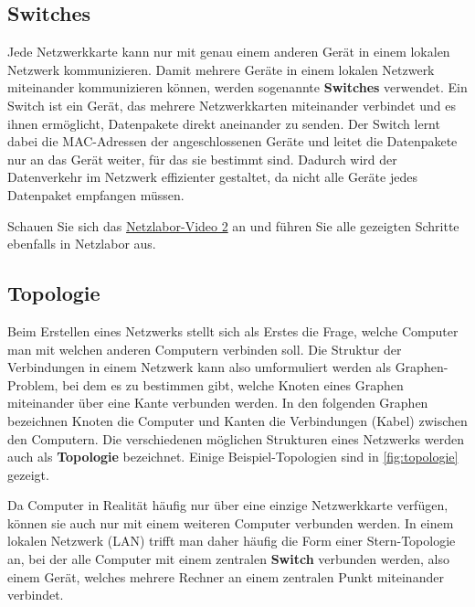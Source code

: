 \subsection{Switches}
Jede Netzwerkkarte kann nur mit genau einem anderen Gerät in einem lokalen Netzwerk kommunizieren. Damit mehrere Geräte in einem lokalen Netzwerk miteinander kommunizieren können, werden sogenannte \textbf{Switches} verwendet. Ein Switch ist ein Gerät, das mehrere Netzwerkkarten miteinander verbindet und es ihnen ermöglicht, Datenpakete direkt aneinander zu senden. Der Switch lernt dabei die \gls{MAC}-Adressen der angeschlossenen Geräte und leitet die Datenpakete nur an das Gerät weiter, für das sie bestimmt sind. Dadurch wird der Datenverkehr im Netzwerk effizienter gestaltet, da nicht alle Geräte jedes Datenpaket empfangen müssen.

\begin{myexercise}
	Schauen Sie sich das \href{\netzlaborvideos}{Netzlabor-Video 2} an und führen Sie alle gezeigten Schritte ebenfalls in Netzlabor aus.
\end{myexercise}

\subsection{Topologie}
Beim Erstellen eines Netzwerks stellt sich als Erstes die Frage, welche Computer man mit welchen anderen Computern verbinden soll. Die Struktur der Verbindungen in einem Netzwerk kann also umformuliert werden als Graphen-Problem, bei dem es zu bestimmen gibt, welche Knoten eines Graphen miteinander über eine Kante verbunden werden. In den folgenden Graphen bezeichnen Knoten die Computer und Kanten die Verbindungen (Kabel) zwischen den Computern. Die verschiedenen möglichen Strukturen eines Netzwerks werden auch als \textbf{Topologie} bezeichnet. Einige Beispiel-Topologien sind in \cref{fig:topologie} gezeigt.


Da Computer in Realität häufig nur über eine einzige Netzwerkkarte verfügen, können sie auch nur mit einem weiteren Computer verbunden werden. In einem lokalen Netzwerk (\gls{LAN}) trifft man daher häufig die Form einer Stern-Topologie an, bei der alle Computer mit einem zentralen \textbf{Switch} verbunden werden, also einem Gerät, welches mehrere Rechner an einem zentralen Punkt miteinander verbindet.


